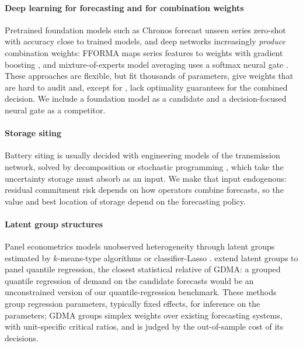 \paragraph{Deep learning for forecasting and for combination weights}
Pretrained foundation models such as Chronos \citep{Ansari2024chronos} forecast unseen series zero-shot with accuracy close to trained models, and deep networks increasingly \emph{produce} combination weights: FFORMA maps series features to weights with gradient boosting \citep{MonteroManso2020}, and mixture-of-experts model averaging uses a softmax neural gate \citep{Gong2026moe}.
These approaches are flexible, but fit thousands of parameters, give weights that are hard to audit and, except for \citet{Gong2026moe}, lack optimality guarantees for the combined decision.
We include a foundation model as a candidate and a decision-focused neural gate as a competitor.

\paragraph{Storage siting}
Battery siting is usually decided with engineering models of the transmission network, solved by decomposition or stochastic programming \citep{Piansky2024battery,Larroux2026bess}, which take the uncertainty storage must absorb as an input.
We make that input endogenous: residual commitment risk depends on how operators combine forecasts, so the value and best location of storage depend on the forecasting policy.

\paragraph{Latent group structures}
Panel econometrics models unobserved heterogeneity through latent groups estimated by $k$-means-type algorithms \citep{LinNg2012,BonhommeManresa2015,AndoBai2016} or classifier-Lasso \citep{Su2016}.
\citet{GuVolgushev2019} extend latent groups to panel quantile regression, the closest statistical relative of GDMA: a grouped quantile regression of demand on the candidate forecasts would be an unconstrained version of our quantile-regression benchmark.
These methods group regression parameters, typically fixed effects, for inference on the parameters; GDMA groups simplex weights over existing forecasting systems, with unit-specific critical ratios, and is judged by the out-of-sample cost of its decisions.

